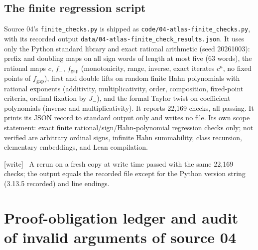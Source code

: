\documentclass[11pt,a4paper]{article}
\numberwithin{equation}{section}
\theoremstyle{plain}
\theoremstyle{definition}
\theoremstyle{remark}
\newcommand{\code}[1]{\texttt{\small #1}}
\newcommand{\fn}[1]{\nolinkurl{#1}}%
\newcommand{\wtag}{\textup{\textsf{[write]}}}%
\newenvironment{wnote}{\par\smallskip\noindent\wtag\ }{\par\smallskip}
\begin{document}
\subsection{The finite regression script}
Source 04's \code{finite\_checks.py} is shipped as
\fn{code/04-atlas-finite_checks.py}, with its recorded output
\fn{data/04-atlas-finite_check_results.json}. It uses only the Python
standard library and exact rational arithmetic (seed 20261003): prefix and
doubling maps on all sign words of length at most five (63 words), the
rational maps $c$, $f_-$, $f_{\mathrm{gap}}$ (monotonicity, range, inverse,
exact iterates $c^n$, no fixed points of $f_{\mathrm{gap}}$), first and double
lifts on random finite Hahn polynomials with rational exponents (additivity,
multiplicativity, order, composition, fixed-point criteria, ordinal fixation
by $J_-$), and the formal Taylor twist on coefficient polynomials (inverse and
multiplicativity). It reports 22,169 checks, all passing. It prints its JSON
record to standard output only and writes no file. Its own scope statement:
exact finite rational/sign/Hahn-polynomial regression checks only; not
verified are arbitrary ordinal signs, infinite Hahn summability, class
recursion, elementary embeddings, and Lean compilation.
\begin{wnote}
A rerun on a fresh copy at write time passed with the same 22,169 checks; the
output equals the recorded file except for the Python version string
(3.13.5 recorded) and line endings.
\end{wnote}

\section{Proof-obligation ledger and audit of invalid arguments of source 04}\label{sse:at:sec:ledger}
\end{document}
